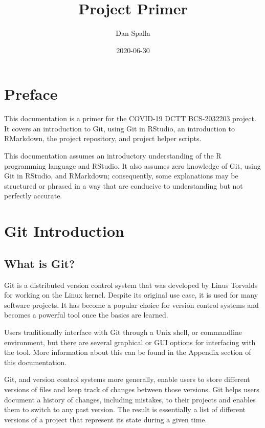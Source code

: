 \documentclass[
]{book}
\title{Project Primer}
\author{Dan Spalla}
\date{2020-06-30}
\begin{document}
\maketitle

{
\setcounter{tocdepth}{1}
\tableofcontents
}
\hypertarget{preface}{%
\chapter*{Preface}\label{preface}}

This documentation is a primer for the COVID-19 DCTT BCS-2032203 project. It covers an introduction to Git, using Git in RStudio, an introduction to RMarkdown, the project repository, and project helper scripts.

This documentation assumes an introductory understanding of the R programming language and RStudio. It also assumes zero knowledge of Git, using Git in RStudio, and RMarkdown; consequently, some explanations may be structured or phrased in a way that are conducive to understanding but not perfectly accurate.

\hypertarget{git-introduction}{%
\chapter{Git Introduction}\label{git-introduction}}

\hypertarget{what-is-git}{%
\section{What is Git?}\label{what-is-git}}

Git is a distributed version control system that was developed by Linus Torvalds for working on the Linux kernel. Despite its original use case, it is used for many software projects. It has become a popular choice for version control systems and becomes a powerful tool once the basics are learned.

Users traditionally interface with Git through a Unix shell, or commandline environment, but there are several graphical or GUI options for interfacing with the tool. More information about this can be found in the Appendix section of this documentation.

Git, and version control systems more generally, enable users to store different versions of files and keep track of changes between those versions. Git helps users document a history of changes, including mistakes, to their projects and enables them to switch to any past version. The result is essentially a list of different versions of a project that represent its state during a given time.
\end{document}
